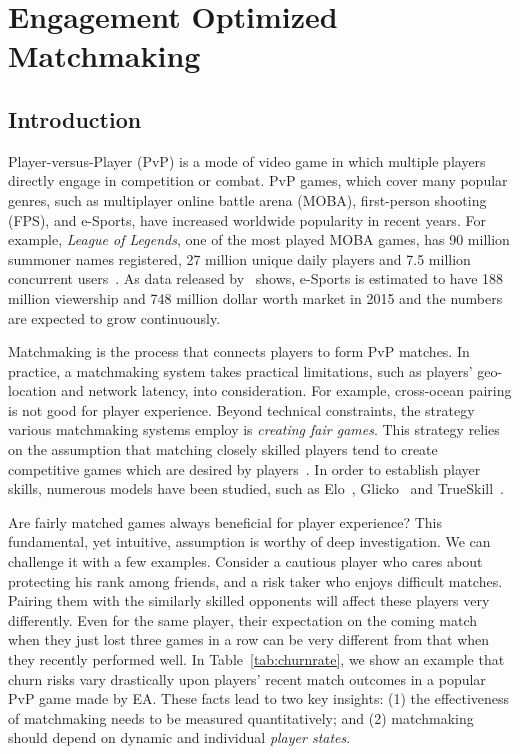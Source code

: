\chapter{Engagement Optimized Matchmaking} 

\label{chapter:eomm} 

\section{Introduction}
Player-versus-Player (PvP) is a mode of video game in which multiple players directly engage in competition or combat. PvP games, which cover many popular genres, such as multiplayer online battle arena (MOBA), first-person shooting (FPS), and e-Sports, have increased worldwide popularity in recent years. For example, \textit{League of Legends}, one of the most played MOBA games, has 90 million summoner names registered, 27 million unique daily players and 7.5 million concurrent users~\cite{fanbase,27million}. As data released by~\cite{superdata} shows, e-Sports is estimated to have 188 million viewership and 748 million dollar worth market in 2015 and the numbers are expected to grow continuously.

Matchmaking is the process that connects players to form PvP matches. In practice, a matchmaking system takes practical limitations, such as players' geo-location and network latency, into consideration. For example, cross-ocean pairing is not good for player experience. Beyond technical constraints, the strategy various matchmaking systems employ is \emph{creating fair games}. This strategy relies on the assumption that matching closely skilled players tend to create competitive games which are desired by players~\cite{graepel2006ranking}. In order to establish player skills, numerous models have been studied, such as Elo~\cite{elo1978rating}, Glicko~\cite{glickman1999parameter} and TrueSkill~\cite{herbrich:trueskill}.

Are fairly matched games always beneficial for player experience? This fundamental, yet intuitive, assumption is worthy of deep investigation. We can challenge it with a few examples. Consider a cautious player who cares about protecting his rank among friends, and a risk taker who enjoys difficult matches. Pairing them with the similarly skilled opponents will affect these players very differently. Even for the same player, their expectation on the coming match when they just lost three games in a row can be very different from that when they recently performed well. In Table~\ref{tab:churnrate}, we show an example that churn risks vary drastically upon players' recent match outcomes in a popular PvP game made by EA. These facts lead to two key insights: (1) the effectiveness of matchmaking needs to be measured quantitatively; and (2) matchmaking should depend on dynamic and individual \emph{player states}.

